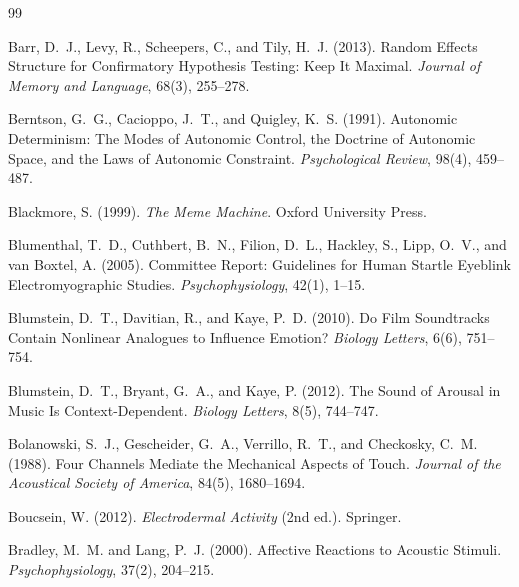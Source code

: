 \documentclass[11pt]{article}
\theoremstyle{plain}
\theoremstyle{definition}
\begin{document}
\begin{thebibliography}{99}
\setlength{\itemsep}{0.35em}

Barr, D.~J., Levy, R., Scheepers, C., and Tily, H.~J. (2013).
Random Effects Structure for Confirmatory Hypothesis Testing: Keep It Maximal.
\textit{Journal of Memory and Language}, 68(3), 255--278.

Berntson, G.~G., Cacioppo, J.~T., and Quigley, K.~S. (1991).
Autonomic Determinism: The Modes of Autonomic Control, the Doctrine of Autonomic Space, and the Laws of Autonomic Constraint.
\textit{Psychological Review}, 98(4), 459--487.

Blackmore, S. (1999).
\textit{The Meme Machine}.
Oxford University Press.

Blumenthal, T.~D., Cuthbert, B.~N., Filion, D.~L., Hackley, S., Lipp, O.~V., and van Boxtel, A. (2005).
Committee Report: Guidelines for Human Startle Eyeblink Electromyographic Studies.
\textit{Psychophysiology}, 42(1), 1--15.

Blumstein, D.~T., Davitian, R., and Kaye, P.~D. (2010).
Do Film Soundtracks Contain Nonlinear Analogues to Influence Emotion?
\textit{Biology Letters}, 6(6), 751--754.

Blumstein, D.~T., Bryant, G.~A., and Kaye, P. (2012).
The Sound of Arousal in Music Is Context-Dependent.
\textit{Biology Letters}, 8(5), 744--747.

Bolanowski, S.~J., Gescheider, G.~A., Verrillo, R.~T., and Checkosky, C.~M. (1988).
Four Channels Mediate the Mechanical Aspects of Touch.
\textit{Journal of the Acoustical Society of America}, 84(5), 1680--1694.

Boucsein, W. (2012).
\textit{Electrodermal Activity} (2nd ed.).
Springer.

Bradley, M.~M. and Lang, P.~J. (2000).
Affective Reactions to Acoustic Stimuli.
\textit{Psychophysiology}, 37(2), 204--215.


\end{thebibliography}
\end{document}
